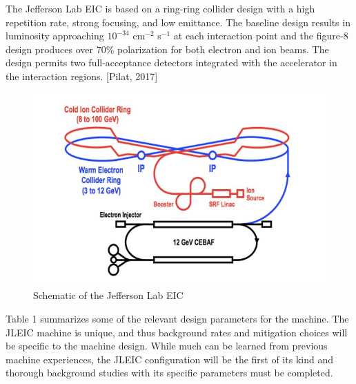 The Jefferson Lab EIC is based on a ring-ring collider design with a high repetition rate, strong focusing, and low emittance.  The baseline design results in luminosity approaching $10^{-34}$ cm$^{-2}$ s$^{-1}$ at each interaction point and the figure-8 design produces over 70\% polarization for both electron and ion beams.  The design permits two full-acceptance detectors integrated with the accelerator in the interaction regions.  [Pilat, 2017]

\begin{figure}
	\centering
	\includegraphics[width=.75\textwidth]{../../img/jleic_schematic.jpg}
	\caption{Schematic of the Jefferson Lab EIC}
	\label{fig:jleic1}
\end{figure}

Table 1 summarizes some of the relevant design parameters for the machine.  The JLEIC machine is unique, and thus background rates and mitigation choices will be specific to the machine design.  While much can be learned from previous machine experiences, the JLEIC configuration will be the first of its kind and thorough background studies with its specific parameters must be completed.

